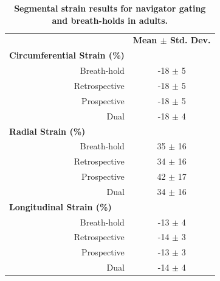 \begin{appendices}
	\begin{table}
		\centering
		\caption[Segmental strain results for navigator gating and breath-holds in adults]{\textbf{Segmental strain results for navigator gating and breath-holds in adults.}}
		\label{table:navigator_segmental_strains}
		\begin{tabular}{c  c}
			\toprule
			\multicolumn{1}{c}{}       			 & \multicolumn{1}{c}{\textbf{Mean $\pm$ Std. Dev.}} \\ 
			\multicolumn{1}{l}{\textbf{Circumferential Strain (\%)}} & \multicolumn{1}{c}{}          \\
			\multicolumn{1}{r}{Breath-hold}      & \multicolumn{1}{c}{-18 $\pm$ 5}                   \\
			\multicolumn{1}{r}{Retrospective}    & \multicolumn{1}{c}{-18 $\pm$ 5}                   \\
			\multicolumn{1}{r}{Prospective}      & \multicolumn{1}{c}{-18 $\pm$ 5}                   \\
			\multicolumn{1}{r}{Dual}    		 & \multicolumn{1}{c}{-18 $\pm$ 4}                   \\
			\multicolumn{1}{l}{\textbf{Radial Strain (\%)}}          & \multicolumn{1}{c}{}        	 \\
			\multicolumn{1}{r}{Breath-hold}      & \multicolumn{1}{c}{35 $\pm$ 16}                   \\
			\multicolumn{1}{r}{Retrospective}    & \multicolumn{1}{c}{34 $\pm$ 16}                   \\
			\multicolumn{1}{r}{Prospective}      & \multicolumn{1}{c}{42 $\pm$ 17}                   \\
			\multicolumn{1}{r}{Dual}		     & \multicolumn{1}{c}{34 $\pm$ 16}                   \\
			\multicolumn{1}{l}{\textbf{Longitudinal Strain (\%)}}    & \multicolumn{1}{c}{}          \\
			\multicolumn{1}{r}{Breath-hold}      & \multicolumn{1}{c}{-13 $\pm$ 4}                   \\
			\multicolumn{1}{r}{Retrospective}    & \multicolumn{1}{c}{-14 $\pm$ 3}                   \\
			\multicolumn{1}{r}{Prospective}      & \multicolumn{1}{c}{-13 $\pm$ 3}                   \\
			\multicolumn{1}{r}{Dual}		     & \multicolumn{1}{c}{-14 $\pm$ 4}            		 \\
			\bottomrule                                                 
		\end{tabular}
	\end{table}
	

\end{appendices}
